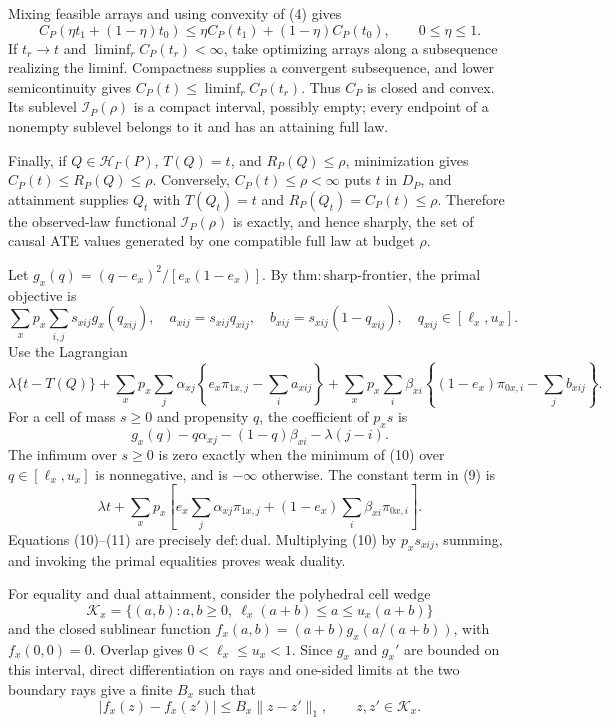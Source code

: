 Mixing feasible arrays and using convexity of (4) gives
\[
C_P(\eta t_1+(1-\eta)t_0)\leq\eta C_P(t_1)+(1-\eta)C_P(t_0),\qquad 0\leq\eta\leq1. \tag{7}
\]
If \(t_r\to t\) and \(\liminf_rC_P(t_r)<\infty\), take optimizing arrays along a subsequence realizing the liminf. Compactness supplies a convergent subsequence, and lower semicontinuity gives \(C_P(t)\leq\liminf_rC_P(t_r)\). Thus \(C_P\) is closed and convex. Its sublevel \(\mathcal I_P(\rho)\) is a compact interval, possibly empty; every endpoint of a nonempty sublevel belongs to it and has an attaining full law.

Finally, if \(Q\in\mathcal H_\Gamma(P)\), \(T(Q)=t\), and \(R_P(Q)\leq\rho\), minimization gives \(C_P(t)\leq R_P(Q)\leq\rho\). Conversely, \(C_P(t)\leq\rho<\infty\) puts \(t\) in \(D_P\), and attainment supplies \(Q_t\) with \(T(Q_t)=t\) and \(R_P(Q_t)=C_P(t)\leq\rho\). Therefore the observed-law functional \(\mathcal I_P(\rho)\) is exactly, and hence sharply, the set of causal ATE values generated by one compatible full law at budget \(\rho\).

Let \(g_x(q)=(q-e_x)^2/[e_x(1-e_x)]\). By \(\mathrm{thm{:}sharp\mbox{-}frontier}\), the primal objective is
\[
\sum_xp_x\sum_{i,j}s_{xij}g_x(q_{xij}),\quad
a_{xij}=s_{xij}q_{xij},\quad b_{xij}=s_{xij}(1-q_{xij}),\quad
q_{xij}\in[\ell_x,u_x]. \tag{8}
\]
Use the Lagrangian
\[
\lambda\{t-T(Q)\}
+\sum_xp_x\sum_j\alpha_{xj}\left\{e_x\pi_{1x,j}-\sum_i a_{xij}\right\}
+\sum_xp_x\sum_i\beta_{xi}\left\{(1-e_x)\pi_{0x,i}-\sum_j b_{xij}\right\}. \tag{9}
\]
For a cell of mass \(s\geq0\) and propensity \(q\), the coefficient of \(p_xs\) is
\[
g_x(q)-q\alpha_{xj}-(1-q)\beta_{xi}-\lambda(j-i). \tag{10}
\]
The infimum over \(s\geq0\) is zero exactly when the minimum of (10) over \(q\in[\ell_x,u_x]\) is nonnegative, and is \(-\infty\) otherwise. The constant term in (9) is
\[
\lambda t+\sum_xp_x\left[e_x\sum_j\alpha_{xj}\pi_{1x,j}
+(1-e_x)\sum_i\beta_{xi}\pi_{0x,i}\right]. \tag{11}
\]
Equations (10)--(11) are precisely \(\mathrm{def{:}dual}\). Multiplying (10) by \(p_xs_{xij}\), summing, and invoking the primal equalities proves weak duality.

For equality and dual attainment, consider the polyhedral cell wedge
\[
\mathcal K_x=\{(a,b):a,b\geq0,\ \ell_x(a+b)\leq a\leq u_x(a+b)\}
\]
and the closed sublinear function \(f_x(a,b)=(a+b)g_x(a/(a+b))\), with \(f_x(0,0)=0\). Overlap gives \(0<\ell_x\leq u_x<1\). Since \(g_x\) and \(g_x'\) are bounded on this interval, direct differentiation on rays and one-sided limits at the two boundary rays give a finite \(B_x\) such that
\[
|f_x(z)-f_x(z')|\leq B_x\|z-z'\|_1,\qquad z,z'\in\mathcal K_x. \tag{12}
\]

